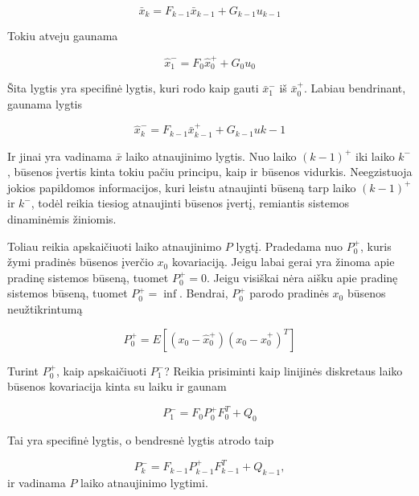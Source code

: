     \begin{equation}
        \bar{x}_k = F_{k-1}\bar{x}_{k-1} + G_{k-1}u_{k-1}
    \end{equation}
    
    Tokiu atveju gaunama

    \begin{equation}
        \hat{x}_1^- = F_0\hat{x}_0^+ + G_0u_0
    \end{equation}

    Šita lygtis yra specifinė lygtis, kuri rodo kaip gauti $\bar{x}_1^-$ iš $\bar{x}_0^+$. Labiau bendrinant, gaunama lygtis

    \begin{equation}
        \hat{x}_k^- = F_{k-1}\bar{x}_{k-1}^+ + G_{k-1}u{k-1}
    \end{equation}

    Ir jinai yra vadinama $\bar{x}$ laiko atnaujinimo lygtis.
    Nuo laiko $(k-1)^+$ iki laiko $k^-$, būsenos įvertis kinta tokiu pačiu principu, kaip ir būsenos vidurkis.
    Neegzistuoja jokios papildomos informacijos, kuri leistu atnaujinti būseną tarp laiko $(k-1)^+$ ir $k^-$, todėl reikia tiesiog atnaujinti būsenos įvertį, remiantis sistemos dinaminėmis žiniomis.

    Toliau reikia apskaičiuoti laiko atnaujinimo $P$ lygtį.
    Pradedama nuo $P_0^+$, kuris žymi pradinės būsenos įverčio $x_0$ kovariaciją.
    Jeigu labai gerai yra žinoma apie pradinę sistemos būseną, tuomet $P_0^+ = 0$.
    Jeigu visiškai nėra aišku apie pradinę sistemos būseną, tuomet $P_0^+ = \inf$.
    Bendrai, $P_0^+$ parodo pradinės $x_0$ būsenos neužtikrintumą

    \begin{equation}
        P_0^+ = E[(x_0 - \hat{x}_0^+)(x_0 - \hat{x}_0^+)^T]
    \end{equation}

    Turint $P_0^+$, kaip apskaičiuoti $P_1^-$? Reikia prisiminti kaip linijinės diskretaus laiko būsenos kovariacija kinta su laiku ir gaunam

    \begin{equation}
        P_1^- = F_0 P_0^+F_0^T + Q_0
    \end{equation}

    Tai yra specifinė lygtis, o bendresnė lygtis atrodo taip

    \begin{equation}
        P_k^- = F_{k-1}P_{k-1}^+F_{k-1}^T + Q_{k-1},
    \end{equation}
    ir vadinama $P$ laiko atnaujinimo lygtimi.

